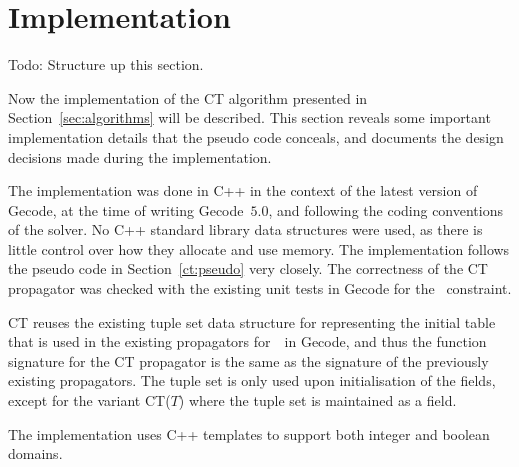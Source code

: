 \documentclass[a4paper,11pt]{article}
\newcommand{\Todo}[1]{{\color{blue}#1}}
\newcommand{\Secref}[1]{Section~\ref{#1}}
\newcommand{\Table}{\Constraint{Table}}
\newcommand{\Supports}{\texttt{supports}}
\numberwithin{equation}{section}
\begin{document}
\section{Implementation}
\label{sec:implementation}

\Todo{Todo: Structure up this section.}

Now the implementation of the CT algorithm presented in 
\Secref{sec:algorithms} will be described.
This section reveals some important implementation details
that the pseudo code conceals, and documents the design decisions made during
the implementation.

The implementation was done in C++ in the context of the latest version of Gecode,
at the time of writing Gecode~$5.0$, and following the coding conventions of
the solver.
No C++ standard library data structures
were used, as there is little control over how they allocate and use memory.
The implementation follows the pseudo code in \Secref{ct:pseudo} very closely.
The correctness of the CT propagator was checked with the existing unit tests
in Gecode for the \Table~constraint.

CT reuses the existing tuple set data structure for representing the initial table
that is used in the existing propagators for~\Table~in Gecode, and thus the function
signature for the CT propagator is the same as the signature of the previously
existing propagators. The tuple set
is only used upon initialisation of the fields, except for the variant CT($T$) where
the tuple set is maintained as a field.

The implementation uses C++ templates to support both integer and boolean domains.


\end{document}
